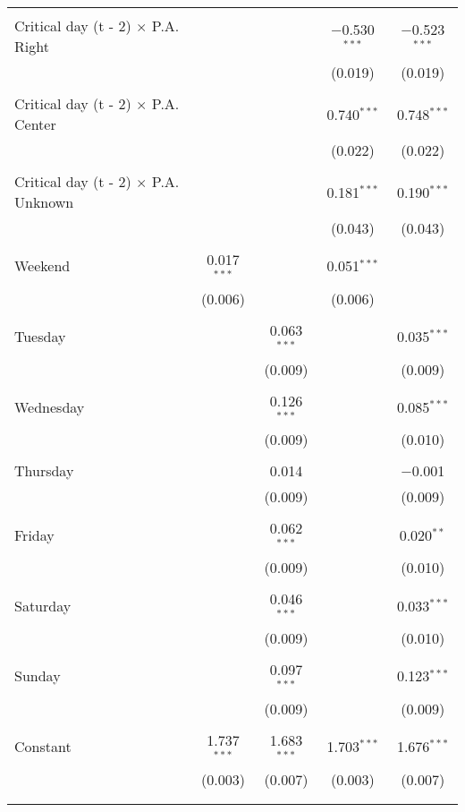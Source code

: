 \documentclass[
]{article}
\begin{document}
\begin{table}[!htbp]
{\begin{tabular}{@{\extracolsep{5pt}}lcccc}
  & & & & \\ 
 Critical day (t - 2) $\times$ P.A. Right &  &  & $-$0.530$^{***}$ & $-$0.523$^{***}$ \\ 
  &  &  & (0.019) & (0.019) \\ 
  & & & & \\ 
 Critical day (t - 2) $\times$ P.A. Center &  &  & 0.740$^{***}$ & 0.748$^{***}$ \\ 
  &  &  & (0.022) & (0.022) \\ 
  & & & & \\ 
 Critical day (t - 2) $\times$ P.A. Unknown &  &  & 0.181$^{***}$ & 0.190$^{***}$ \\ 
  &  &  & (0.043) & (0.043) \\ 
  & & & & \\ 
 Weekend & 0.017$^{***}$ &  & 0.051$^{***}$ &  \\ 
  & (0.006) &  & (0.006) &  \\ 
  & & & & \\ 
 Tuesday &  & 0.063$^{***}$ &  & 0.035$^{***}$ \\ 
  &  & (0.009) &  & (0.009) \\ 
  & & & & \\ 
 Wednesday &  & 0.126$^{***}$ &  & 0.085$^{***}$ \\ 
  &  & (0.009) &  & (0.010) \\ 
  & & & & \\ 
 Thursday &  & 0.014 &  & $-$0.001 \\ 
  &  & (0.009) &  & (0.009) \\ 
  & & & & \\ 
 Friday &  & 0.062$^{***}$ &  & 0.020$^{**}$ \\ 
  &  & (0.009) &  & (0.010) \\ 
  & & & & \\ 
 Saturday &  & 0.046$^{***}$ &  & 0.033$^{***}$ \\ 
  &  & (0.009) &  & (0.010) \\ 
  & & & & \\ 
 Sunday &  & 0.097$^{***}$ &  & 0.123$^{***}$ \\ 
  &  & (0.009) &  & (0.009) \\ 
  & & & & \\ 
 Constant & 1.737$^{***}$ & 1.683$^{***}$ & 1.703$^{***}$ & 1.676$^{***}$ \\ 
  & (0.003) & (0.007) & (0.003) & (0.007) \\ 
  & & & & \\ 
\hline \\[-1.8ex] 

\end{tabular}}
\end{table}
\end{document}
